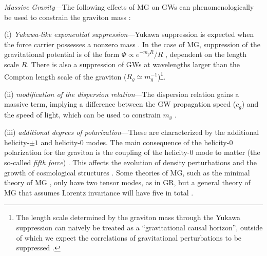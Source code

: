 \documentclass[prd,twocolumn,aps,psfig,nofootinbib,nobibnotes,superscriptaddress,preprintnumbers,times]{revtex4-2}
\begin{document}
\textit{Massive Gravity}---The following effects of MG on GWs can phenomenologically be used to constrain the graviton mass \cite{deRham:2016nuf}:

(i) \textit{Yukawa-like exponential suppression}---Yukawa suppression is expected when the force carrier possesses a nonzero mass \cite{Will:1997bb}. In the case of MG, suppression of the gravitational potential is of the form $\Phi \propto e^{-m_gR}/R$ \cite{Will:1997bb}, dependent on the length scale $R$. There is also a suppression of GWs at wavelengths larger than the Compton length scale of the graviton ($R_g \simeq m_g^{-1}$)\footnote{The length scale determined by the graviton mass through the Yukawa suppression can naively be treated as a ``gravitational causal horizon'', outside of which we expect the correlations of gravitational perturbations to be suppressed \cite{Will:1997bb}.}.

(ii) \textit{modification of the dispersion relation}---The dispersion relation gains a massive term, implying a difference between the GW propagation speed ($c_g$) and the speed of light, which can be used to constrain $m_g$ \cite{LIGOScientific:2017vwq, LIGOScientific:2017zic, LIGOScientific:2017ync}. 

(iii) \textit{additional degrees of polarization}---These are characterized by the additional helicity-$\pm 1$ and helicity-$0$ modes. The main consequence of the helicity-$0$ polarization for the graviton is the coupling of the helicity-0 mode to matter (the so-called {\it fifth force}) \cite{deRham:2014naa}. This affects the evolution of density perturbations and the growth of cosmological structures \cite{Sipp:2022kmb}. Some theories of MG, such as the minimal theory of MG \cite{DeFelice:2015hla}, only have two tensor modes, as in GR, but a general theory of MG that assumes Lorentz invariance will have five in total \cite{Comelli:2013tja}.
\end{document}
